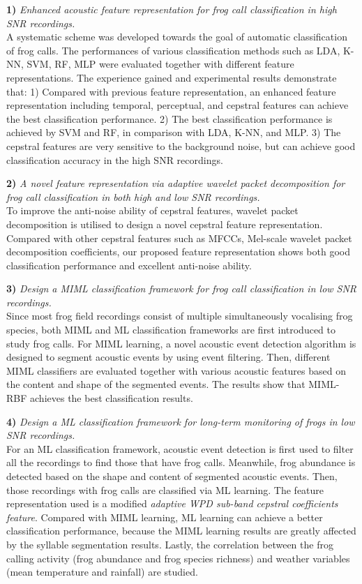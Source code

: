 	
\textbf{1)} \textit{Enhanced acoustic feature representation for frog call classification in high SNR recordings.} 
\\
A systematic scheme was developed towards the goal of automatic classification of frog calls. The performances of various classification methods such as LDA, K-NN, SVM, RF, MLP were evaluated together with different feature representations. The experience gained and experimental results demonstrate that: 1) Compared with previous feature representation, an enhanced feature representation including temporal, perceptual, and cepstral features can achieve the best classification performance. 2) The best classification performance is achieved by SVM and RF, in comparison with LDA, K-NN, and MLP. 3) The cepstral features are very sensitive to the background noise, but can achieve good classification accuracy in the high SNR recordings. 

\textbf{2)} \textit{A novel feature representation via adaptive wavelet packet decomposition for frog call classification in both high and low SNR recordings.}
\\
To improve the anti-noise ability of cepstral features, wavelet packet decomposition is utilised to design a novel cepstral feature representation. Compared with other cepstral features such as MFCCs, Mel-scale wavelet packet decomposition coefficients, our proposed feature representation shows both good classification performance and excellent anti-noise ability. 



\textbf{3)}  \textit{Design a MIML classification framework for frog call classification in low SNR recordings.} 
\\
Since most frog field recordings consist of multiple simultaneously vocalising frog species, both MIML and ML classification frameworks are first introduced to study frog calls. For MIML learning, a novel acoustic event detection algorithm is designed to segment acoustic events by using event filtering. Then, different MIML classifiers are evaluated together with various acoustic features based on the content and shape of the segmented events. The results show that MIML-RBF achieves the best classification results. 


\textbf{4)}  \textit{Design a ML classification framework for long-term monitoring of frogs in low SNR recordings.} 
\\
For an ML classification framework, acoustic event detection is first used to filter all the recordings to find those that have frog calls. Meanwhile, frog abundance is detected based on the shape and content of segmented acoustic events. Then, those recordings with frog calls are classified via ML learning. The feature representation used is a modified \textit{adaptive WPD sub-band cepstral coefficients feature}. Compared with MIML learning, ML learning can achieve a better classification performance, because the MIML learning results are greatly affected by the syllable segmentation results. Lastly, the correlation between the frog calling activity (frog abundance and frog species richness) and weather variables (mean temperature and rainfall) are studied.

